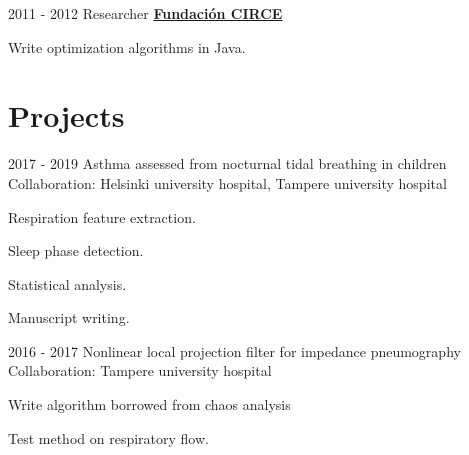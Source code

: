 \documentclass[letterpaper]{twentysecondcv} %
\begin{document}
\begin{RigthPage1}
\begin{twenty}
	\twentyitemlist
    	{2011 - 2012}
        {Researcher}
        {\href{https://http://www.fcirce.es//}{\textbf{Fundaci\'on CIRCE}}}
        {
        \item Write optimization algorithms in Java.
        }
\end{twenty}

\section{Projects}
\begin{twenty} %
	\twentyitemlist
    	{2017 - 2019}
        {Asthma assessed from nocturnal tidal breathing in children~\cite{children,infants}}
        {\\Collaboration: Helsinki university hospital, Tampere university hospital }
        {
        \item Respiration feature extraction.
        \item Sleep phase detection.
        \item Statistical analysis.
        \item Manuscript writing.
        }
        

	\twentyitemlist
    	{2016 - 2017}
        {Nonlinear local projection filter for impedance pneumography~\cite{nlpf}}
        {\\Collaboration: Tampere university hospital }
        {
        \item Write algorithm borrowed from chaos analysis
        \item Test method on respiratory flow.
		}
       

\end{twenty}
\end{RigthPage1}
\end{document}
